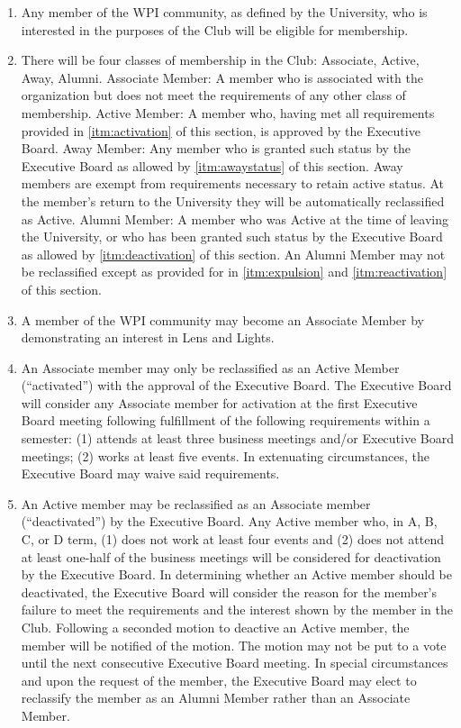 \documentclass[12pt,letterpaper]{book}
\begin{document}
\begin{enumerate}

\item \label{itm:wpicommunity} Any member of the WPI community, as defined by the University, who is interested in the purposes of the Club will be eligible for membership.
\item \label{itm:classesofmembership} There will be four classes of membership in the Club: Associate, Active, Away, Alumni.
\subitem Associate Member: A member who is associated with the organization but does not meet the requirements of any other class of membership.
\subitem Active Member: A member who, having met all requirements provided in \cref{itm:activation} of this section, is approved by the Executive Board.
\subitem Away Member: Any member who is granted such status by the Executive Board as allowed by \cref{itm:awaystatus} of this section. Away members are exempt from requirements necessary to retain active status. At the member’s return to the University they will be automatically reclassified as Active.
\subitem Alumni Member: A member who was Active at the time of leaving the University, or who has been granted such status by the Executive Board as allowed by \cref{itm:deactivation} of this section. An Alumni Member may not be reclassified except as provided for in \cref{itm:expulsion} and \cref{itm:reactivation} of this section.
\item \label{itm:association} A member of the WPI community may become an Associate Member by demonstrating an interest in Lens and Lights.
\item \label{itm:activation} An Associate member may only be reclassified as an Active Member (“activated”) with the approval of the Executive Board. The Executive Board will consider any Associate member for activation at the first Executive Board meeting following fulfillment of the following requirements within a semester: (1) attends at least three business meetings and/or Executive Board meetings; (2) works at least five events. In extenuating circumstances, the Executive Board may waive said requirements.
\item \label{itm:deactivation} An Active member may be reclassified as an Associate member (“deactivated”) by the Executive Board. Any Active member who, in A, B, C, or D term, (1) does not work at least four events and (2) does not attend at least one-half of the business meetings will be considered for deactivation by the Executive Board. In determining whether an Active member should be deactivated, the Executive Board will consider the reason for the member’s failure to meet the requirements and the interest shown by the member in the Club. Following a seconded motion to deactive an Active member, the member will be notified of the motion. The motion may not be put to a vote until the next consecutive Executive Board meeting. In special circumstances and upon the request of the member, the Executive Board may elect to reclassify the member as an Alumni Member rather than an Associate Member.

\end{enumerate}
\end{document}
